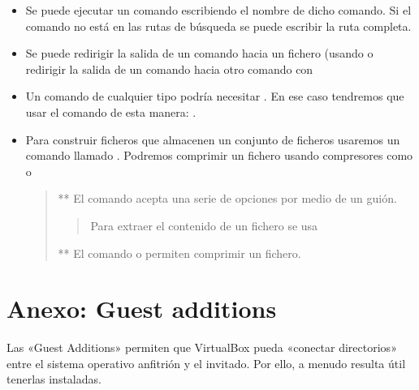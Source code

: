 \documentclass[letterpaper,10pt,spanish]{sphinxmanual}
\begin{document}
\begin{itemize}
\item {} 
Se puede ejecutar un comando escribiendo el nombre de dicho comando. Si el comando no está en las rutas de búsqueda se puede escribir la ruta completa.

\item {} 
Se puede redirigir la salida de un comando hacia un fichero (usando   o redirigir la salida de un comando hacia otro comando con 

\item {} 
Un comando de cualquier tipo podría necesitar . En ese caso tendremos que usar el comando  de esta manera:  .

\item {} 
Para construir ficheros que almacenen un conjunto de ficheros usaremos un comando llamado  . Podremos comprimir un fichero usando compresores como  o 
\begin{quote}

** El comando  acepta una serie de opciones por medio de un guión.
\begin{quote}

 Para extraer el contenido de un fichero se usa 
\end{quote}

** El comando  o  permiten comprimir un fichero.
\end{quote}

\end{itemize}


\section{Anexo: Guest additions}
\label{\detokenize{tema_pautas_seguridad_informatica/tema_pautas_seguridad_informatica:anexo-guest-additions}}
Las «Guest Additions» permiten que VirtualBox pueda «conectar directorios» entre el sistema operativo anfitrión y el invitado. Por ello, a menudo resulta útil tenerlas instaladas.
\end{document}
